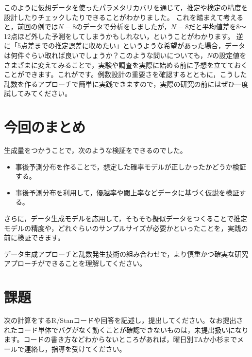 \documentclass{ltjsbook}
\begin{document}
このように仮想データを使ったパラメタリカバリを通じて，推定や検定の精度を設計したりチェックしたりできることがわかりました。
これを踏まえて考えると，前回の例では$N=8$のデータで分析をしましたが，$N=8$だと平均値差を8〜12点ほど外した予測をしてしまうかもしれない，ということがわかります。
逆に「5点差までの推定誤差に収めたい」というような希望があった場合，データは何件ぐらい取れば良いでしょうか？このような問いについても，$N$の設定値をさまざまに変えてみることで，実験や調査を実際に始める前に予想を立てておくことができます。これがです。例数設計の重要さを確認するとともに，こうした乱数を作るアプローチで簡単に実践できますので，実際の研究の前にはぜひ一度試してみてください。

\section{今回のまとめ}
生成量をつかうことで，次のような検証をできるのでした。
\begin{itemize}
	\item 事後予測分布を作ることで，想定した確率モデルが正しかったかどうか検証する。
	\item 事後予測分布を利用して，優越率や閾上率などデータに基づく仮説を検証する。
\end{itemize}
さらに，データ生成モデルを応用して，そもそも擬似データをつくることで推定モデルの精度や，どれぐらいのサンプルサイズが必要かといったことを，実践の前に検証できます。

データ生成アプローチと乱数発生技術の組み合わせで，より慎重かつ確実な研究アプローチができることを理解してください。

\section{課題}
次の計算をするR/Stanコードや回答を記述し，提出してください。なお提出されたコード単体でバグがなく動くことが確認できないものは，未提出扱いになります。コードの書き方などわからないところがあれば，曜日別TAか小杉までメールで連絡し，指導を受けてください。
\end{document}
